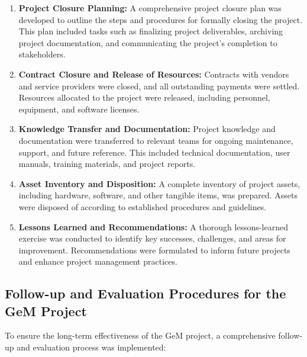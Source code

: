 \begin{enumerate}
    \item \textbf{Project Closure Planning:} A comprehensive project closure plan was developed to outline the steps and procedures for formally closing the project. This plan included tasks such as finalizing project deliverables, archiving project documentation, and communicating the project's completion to stakeholders.
    
    \item \textbf{Contract Closure and Release of Resources:} Contracts with vendors and service providers were closed, and all outstanding payments were settled. Resources allocated to the project were released, including personnel, equipment, and software licenses.
    
    \item \textbf{Knowledge Transfer and Documentation:} Project knowledge and documentation were transferred to relevant teams for ongoing maintenance, support, and future reference. This included technical documentation, user manuals, training materials, and project reports.
    
    \item \textbf{Asset Inventory and Disposition:} A complete inventory of project assets, including hardware, software, and other tangible items, was prepared. Assets were disposed of according to established procedures and guidelines.
    
    \item \textbf{Lessons Learned and Recommendations:} A thorough lessons-learned exercise was conducted to identify key successes, challenges, and areas for improvement. Recommendations were formulated to inform future projects and enhance project management practices.
\end{enumerate}

\subsection{Follow-up and Evaluation Procedures for the GeM Project}

To ensure the long-term effectiveness of the GeM project, a comprehensive follow-up and evaluation process was implemented:


